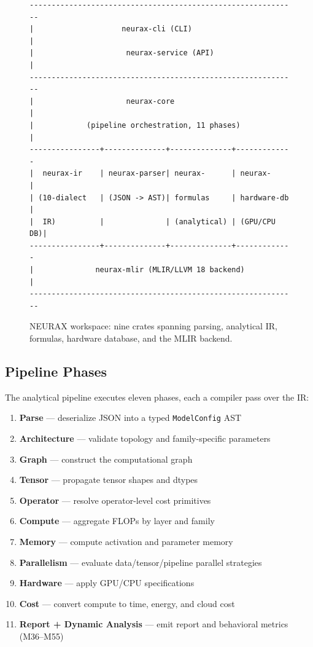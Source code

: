 \documentclass[11pt]{article}
\begin{document}
\begin{figure}[ht]
\centering
\begin{verbatim}
-------------------------------------------------------------
|                    neurax-cli (CLI)                       |
|                     neurax-service (API)                  |
-------------------------------------------------------------
|                     neurax-core                           |
|            (pipeline orchestration, 11 phases)            |
----------------+--------------+--------------+-------------
|  neurax-ir    | neurax-parser| neurax-      | neurax-     |
| (10-dialect   | (JSON -> AST)| formulas     | hardware-db |
|  IR)          |              | (analytical) | (GPU/CPU DB)|
----------------+--------------+--------------+-------------
|              neurax-mlir (MLIR/LLVM 18 backend)           |
-------------------------------------------------------------
\end{verbatim}
\caption{NEURAX workspace: nine crates spanning parsing, analytical IR, formulas, hardware database, and the MLIR backend.}
\label{fig:arch}
\end{figure}

\subsection{Pipeline Phases}

The analytical pipeline executes eleven phases, each a compiler pass over the IR:
\begin{enumerate}
  \item \textbf{Parse} --- deserialize JSON into a typed \texttt{ModelConfig} AST
  \item \textbf{Architecture} --- validate topology and family-specific parameters
  \item \textbf{Graph} --- construct the computational graph
  \item \textbf{Tensor} --- propagate tensor shapes and dtypes
  \item \textbf{Operator} --- resolve operator-level cost primitives
  \item \textbf{Compute} --- aggregate FLOPs by layer and family
  \item \textbf{Memory} --- compute activation and parameter memory
  \item \textbf{Parallelism} --- evaluate data/tensor/pipeline parallel strategies
  \item \textbf{Hardware} --- apply GPU/CPU specifications
  \item \textbf{Cost} --- convert compute to time, energy, and cloud cost
  \item \textbf{Report + Dynamic Analysis} --- emit report and behavioral metrics (M36--M55)
\end{enumerate}
\end{document}
